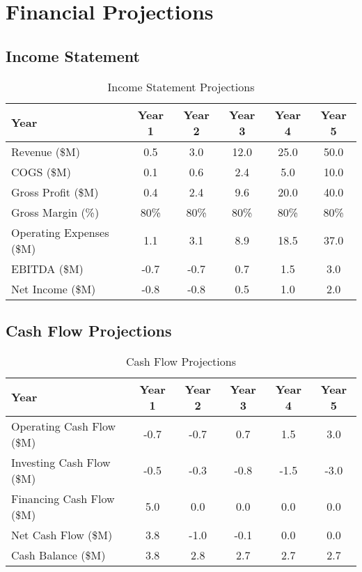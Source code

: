 \documentclass[business]{../templates/infraradar-main}
\begin{document}
\section{Financial Projections}

\subsection{Income Statement}
\begin{table}[h]
\centering
\begin{tabular}{|l|c|c|c|c|c|}
\hline
\textbf{Year} & \textbf{Year 1} & \textbf{Year 2} & \textbf{Year 3} & \textbf{Year 4} & \textbf{Year 5} \\
\hline
Revenue (\$M) & 0.5 & 3.0 & 12.0 & 25.0 & 50.0 \\
\hline
COGS (\$M) & 0.1 & 0.6 & 2.4 & 5.0 & 10.0 \\
\hline
Gross Profit (\$M) & 0.4 & 2.4 & 9.6 & 20.0 & 40.0 \\
\hline
Gross Margin (\%) & 80\% & 80\% & 80\% & 80\% & 80\% \\
\hline
Operating Expenses (\$M) & 1.1 & 3.1 & 8.9 & 18.5 & 37.0 \\
\hline
EBITDA (\$M) & -0.7 & -0.7 & 0.7 & 1.5 & 3.0 \\
\hline
Net Income (\$M) & -0.8 & -0.8 & 0.5 & 1.0 & 2.0 \\
\hline
\end{tabular}
\caption{Income Statement Projections}
\end{table}

\subsection{Cash Flow Projections}
\begin{table}[h]
\centering
\begin{tabular}{|l|c|c|c|c|c|}
\hline
\textbf{Year} & \textbf{Year 1} & \textbf{Year 2} & \textbf{Year 3} & \textbf{Year 4} & \textbf{Year 5} \\
\hline
Operating Cash Flow (\$M) & -0.7 & -0.7 & 0.7 & 1.5 & 3.0 \\
\hline
Investing Cash Flow (\$M) & -0.5 & -0.3 & -0.8 & -1.5 & -3.0 \\
\hline
Financing Cash Flow (\$M) & 5.0 & 0.0 & 0.0 & 0.0 & 0.0 \\
\hline
Net Cash Flow (\$M) & 3.8 & -1.0 & -0.1 & 0.0 & 0.0 \\
\hline
Cash Balance (\$M) & 3.8 & 2.8 & 2.7 & 2.7 & 2.7 \\
\hline
\end{tabular}
\caption{Cash Flow Projections}
\end{table}
\end{document}

